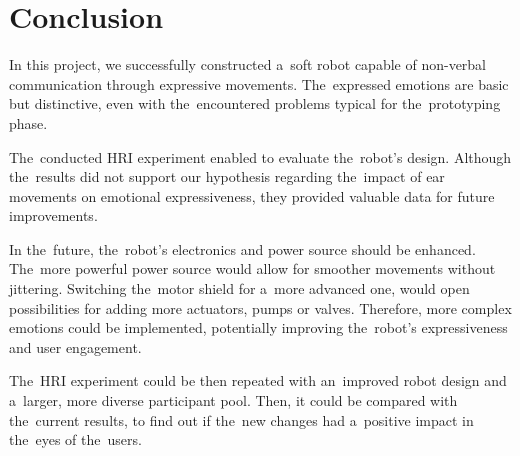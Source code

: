 \section{Conclusion} %

\par In this project, we successfully constructed a~soft robot capable of non-verbal communication through expressive movements. The~expressed emotions are basic but distinctive, even with the~encountered problems typical for the~prototyping phase.

\par The~conducted HRI experiment enabled to evaluate the~robot's design. Although the~results did not support our hypothesis regarding the~impact of ear movements on emotional expressiveness, they provided valuable data for future improvements.

\par In the~future, the~robot's electronics and power source should be enhanced. The~more powerful power source would allow for smoother movements without jittering. Switching the~motor shield for a~more advanced one, would open possibilities for adding more actuators, pumps or valves. Therefore, more complex emotions could be implemented, potentially improving the~robot's expressiveness and user engagement.

\par The~HRI experiment could be then repeated with an~improved robot design and a~larger, more diverse participant pool. Then, it could be compared with the~current results, to find out if the~new changes had a~positive impact in the~eyes of the~users.
